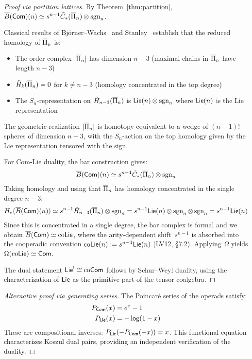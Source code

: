\begin{proof}[Proof via partition lattices]
By Theorem~\ref{thm:partition}, $\overline{B}(\mathsf{Com})(n) \simeq s^{n-1}\tilde{C}_{*}(\overline{\Pi}_n) \otimes \operatorname{sgn}_n$.
 
Classical results of Björner--Wachs~\cite{BW83} and Stanley~\cite{Sta97} establish that the reduced homology of $\overline{\Pi}_n$ is:
\begin{itemize}
\item The order complex $|\overline{\Pi}_n|$ has dimension $n-3$ (maximal chains in $\overline{\Pi}_n$ have length $n-3$)
\item $\tilde{H}_k(\overline{\Pi}_n) = 0$ for $k \neq n-3$ (homology concentrated in the top degree)
\item The $S_n$-representation on $\tilde{H}_{n-3}(\overline{\Pi}_n)$ is $\mathsf{Lie}(n) \otimes \operatorname{sgn}_n$ where $\mathsf{Lie}(n)$ is the Lie representation
\end{itemize}

The geometric realization $|\overline{\Pi}_n|$ is homotopy equivalent to a wedge of $(n-1)!$ spheres of dimension $n-3$, with the $S_n$-action on the top homology given by the Lie representation tensored with the sign.

For Com-Lie duality, the bar construction gives:
\[\overline{B}(\mathsf{Com})(n) \simeq s^{n-1}\tilde{C}_{*}(\overline{\Pi}_n) \otimes \operatorname{sgn}_n\]
Taking homology and using that $\overline{\Pi}_n$ has homology concentrated in the single degree $n-3$:
\[H_*(\overline{B}(\mathsf{Com})(n)) \simeq s^{n-1}\tilde{H}_{n-3}(\overline{\Pi}_n) \otimes \operatorname{sgn}_n = s^{n-1}\mathsf{Lie}(n) \otimes \operatorname{sgn}_n \otimes \operatorname{sgn}_n = s^{n-1}\mathsf{Lie}(n)\]
Since this is concentrated in a single degree, the bar complex is formal and we obtain $\overline{B}(\mathsf{Com}) \simeq \text{co}\mathsf{Lie}$, where the arity-dependent shift~$s^{n-1}$ is absorbed into the cooperadic convention $\text{co}\mathsf{Lie}(n) := s^{n-1}\mathsf{Lie}(n)$ (LV12, \S7.2).
Applying $\Omega$ yields $\Omega(\text{co}\mathsf{Lie}) \simeq \mathsf{Com}$.
 
The dual statement $\mathsf{Lie}^! \cong \text{co}\mathsf{Com}$ follows by Schur--Weyl duality, using the characterization of $\mathsf{Lie}$ as the primitive part of the tensor coalgebra.
\end{proof}
 
\begin{proof}[Alternative proof via generating series]
The Poincaré series of the operads satisfy:
\begin{align}
P_{\mathsf{Com}}(x) &= e^x - 1 \\
P_{\mathsf{Lie}}(x) &= -\log(1 - x)
\end{align}
These are compositional inverses: $P_{\mathsf{Lie}}(-P_{\mathsf{Com}}(-x)) = x$. This functional equation characterizes Koszul dual pairs, providing an independent verification of the duality.
\end{proof}
 
